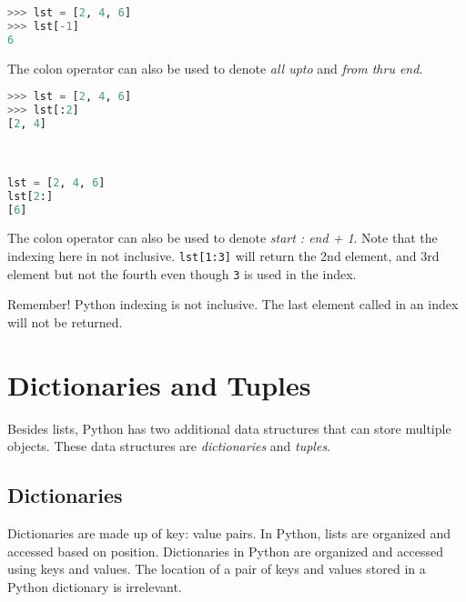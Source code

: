 \documentclass{book}
\newcommand{\passthrough}[1]{#1}
\begin{document}
\begin{lstlisting}[language=Python]
>>> lst = [2, 4, 6]
>>> lst[-1]
6
\end{lstlisting}

The colon operator can also be used to denote \emph{all upto} and
\emph{from thru end}.

\begin{lstlisting}[language=Python]
>>> lst = [2, 4, 6]
>>> lst[:2]
[2, 4]



lst = [2, 4, 6]
lst[2:]
[6]
\end{lstlisting}

The colon operator can also be used to denote \emph{start : end + 1}.
Note that the indexing here in not inclusive.
\passthrough{\lstinline!lst[1:3]!} will return the 2nd element, and 3rd
element but not the fourth even though \passthrough{\lstinline!3!} is
used in the index.

Remember! Python indexing is not inclusive. The last element called in
an index will not be returned.
    




    
        \hypertarget{dictionaries-and-tuples}{%
\section{Dictionaries and Tuples}\label{dictionaries-and-tuples}}
    




    
        Besides lists, Python has two additional data structures that can store
multiple objects. These data structures are \emph{dictionaries} and
\emph{tuples}.
    




    
        \hypertarget{dictionaries}{%
\subsection{Dictionaries}\label{dictionaries}}
    




    
        Dictionaries are made up of key: value pairs. In Python, lists are
organized and accessed based on position. Dictionaries in Python are
organized and accessed using keys and values. The location of a pair of
keys and values stored in a Python dictionary is irrelevant.
\end{document}

